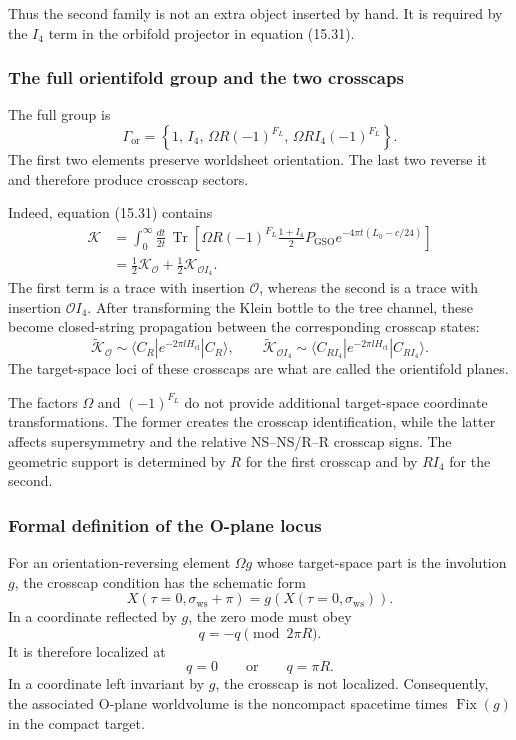 \documentclass[
  10pt,
  a4paper,
  openany]{book}
\begin{document}
Thus the second family is not an extra object inserted by hand. It is
required by the \(I_4\) term in the orbifold projector in equation
(15.31).

\subsubsection{The full orientifold group and the two
crosscaps}\label{the-full-orientifold-group-and-the-two-crosscaps}

The full group is \[
\Gamma_{\mathrm{or}}
=
\left\{
1,\,
I_4,\,
\Omega R(-1)^{F_L},\,
\Omega RI_4(-1)^{F_L}
\right\}.
\] The first two elements preserve worldsheet orientation. The last two
reverse it and therefore produce crosscap sectors.

Indeed, equation (15.31) contains \[
\begin{aligned}
\mathcal K
&=
\int_0^\infty\frac{dt}{2t}\,
\operatorname{Tr}
\left[
\Omega R(-1)^{F_L}
\frac{1+I_4}{2}
P_{\mathrm{GSO}}
e^{-4\pi t(L_0-c/24)}
\right]\\
&=
\frac12\mathcal K_{\mathcal O}
+
\frac12\mathcal K_{\mathcal O I_4}.
\end{aligned}
\] The first term is a trace with insertion \(\mathcal O\), whereas the
second is a trace with insertion \(\mathcal OI_4\). After transforming
the Klein bottle to the tree channel, these become closed-string
propagation between the corresponding crosscap states: \[
\widetilde{\mathcal K}_{\mathcal O}
\sim
\langle C_R|e^{-2\pi lH_{\mathrm{cl}}}|C_R\rangle,
\qquad
\widetilde{\mathcal K}_{\mathcal OI_4}
\sim
\langle C_{RI_4}|e^{-2\pi lH_{\mathrm{cl}}}|C_{RI_4}\rangle.
\] The target-space loci of these crosscaps are what are called the
orientifold planes.

The factors \(\Omega\) and \((-1)^{F_L}\) do not provide additional
target-space coordinate transformations. The former creates the crosscap
identification, while the latter affects supersymmetry and the relative
NS--NS/R--R crosscap signs. The geometric support is determined by \(R\)
for the first crosscap and by \(RI_4\) for the second.

\subsubsection{Formal definition of the O-plane
locus}\label{formal-definition-of-the-o-plane-locus}

For an orientation-reversing element \(\Omega g\) whose target-space
part is the involution \(g\), the crosscap condition has the schematic
form \[
X(\tau=0,\sigma_{\mathrm{ws}}+\pi)
=
g\!\left(X(\tau=0,\sigma_{\mathrm{ws}})\right).
\] In a coordinate reflected by \(g\), the zero mode must obey \[
q=-q
\pmod{2\pi R}.
\] It is therefore localized at \[
q=0
\qquad\text{or}\qquad
q=\pi R.
\] In a coordinate left invariant by \(g\), the crosscap is not
localized. Consequently, the associated O-plane worldvolume is the
noncompact spacetime times \(\operatorname{Fix}(g)\) in the compact
target.
\end{document}
